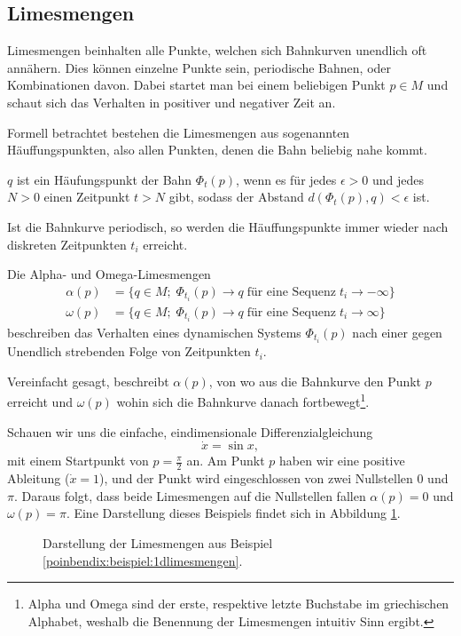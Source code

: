 \subsection{Limesmengen} \label{poinbendix:subsection:limesmengen}

Limesmengen beinhalten alle Punkte, welchen sich Bahnkurven unendlich oft annähern.
Dies können einzelne Punkte sein, periodische Bahnen, oder Kombinationen davon.
Dabei startet man bei einem beliebigen Punkt $p \in M$ und schaut sich das Verhalten in positiver und negativer Zeit an.

Formell betrachtet bestehen die Limesmengen aus sogenannten Häuffungspunkten, also allen Punkten, denen die Bahn beliebig nahe kommt.
\begin{definition}[Häuffungspunkte]
\label{poinbendix:def:limesmengen}
$q$ ist ein Häufungspunkt der Bahn $\Phi_t(p)$, wenn es für jedes $\epsilon > 0$ und jedes $N > 0$ einen Zeitpunkt $t > N$ gibt, sodass der Abstand $d(\Phi_t(p),q) < \epsilon$ ist.
\end{definition}

Ist die Bahnkurve periodisch, so werden die Häuffungspunkte immer wieder nach diskreten Zeitpunkten $t_i$ erreicht.
\begin{definition}[Limesmengen]
\label{poinbendix:def:limesmengen}
Die Alpha- und Omega-Limesmengen
\begin{align*}
    \alpha(p) &= \{q\in M; \; \Phi_{t_i}(p) \to q \; \text{für eine Sequenz} \; t_i \to -\infty\} \\
    \omega(p) &= \{q\in M; \; \Phi_{t_i}(p) \to q \; \text{für eine Sequenz} \; t_i \to \infty\}
\end{align*}
beschreiben das Verhalten eines dynamischen Systems $\Phi_{t_i}(p)$ nach einer gegen Unendlich strebenden Folge von Zeitpunkten $t_i$.
\end{definition}

Vereinfacht gesagt, beschreibt $\alpha(p)$, von wo aus die Bahnkurve den Punkt $p$ erreicht und $\omega(p)$ wohin sich die Bahnkurve danach fortbewegt\footnote{Alpha und Omega sind der erste, respektive letzte Buchstabe im griechischen Alphabet, weshalb die Benennung der Limesmengen intuitiv Sinn ergibt.}.

\begin{beispiel} \label{poinbendix:beispiel:1dlimesmengen}
Schauen wir uns die einfache, eindimensionale Differenzialgleichung
\begin{equation*}
    \dot{x} = \sin x,
\end{equation*}
mit einem Startpunkt von $p = \frac{\pi}{2}$ an.
Am Punkt $p$ haben wir eine positive Ableitung ($\dot{x} = 1$), und der Punkt wird eingeschlossen von zwei Nullstellen $0$ und $\pi$.
Daraus folgt, dass beide Limesmengen auf die Nullstellen fallen $\alpha(p) = 0$ und $\omega(p) = \pi$.
Eine Darstellung dieses Beispiels findet sich in Abbildung \ref{poinbendix:fig:limesmenge}.
\begin{figure}
    \centering
    
    \caption{Darstellung der Limesmengen aus Beispiel \ref{poinbendix:beispiel:1dlimesmengen}.}
    \label{poinbendix:fig:limesmenge}
\end{figure}
\end{beispiel}
